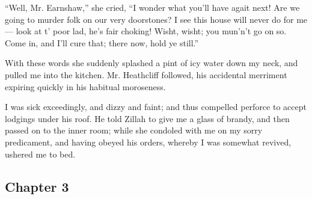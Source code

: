 \par “Well, Mr. Earnshaw,” she cried, “I wonder what you'll have agait next! Are we going to murder folk on our very doorstones? I see this house will never do for me — look at t' poor lad, he's fair choking! Wisht, wisht; you mun'n't go on so. Come in, and I'll cure that; there now, hold ye still.”
\par With these words she suddenly splashed a pint of icy water down my neck, and pulled me into the kitchen. Mr. Heathcliff followed, his accidental merriment expiring quickly in his habitual moroseness.
\par I was sick exceedingly, and dizzy and faint; and thus compelled perforce to accept lodgings under his roof. He told Zillah to give me a glass of brandy, and then passed on to the inner room; while she condoled with me on my sorry predicament, and having obeyed his orders, whereby I was somewhat revived, ushered me to bed.






\subsection*{Chapter 3}


